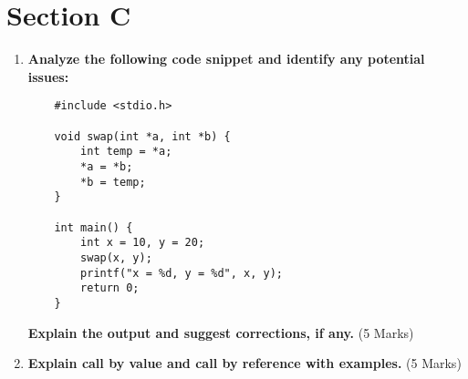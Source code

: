 \documentclass[a4paper,12pt]{article}
\begin{document}
\vspace{10pt}

\section*{\centering Section C}

\begin{enumerate}[label=\textbf{Q\arabic*.}, start=8]

    \item \textbf{Analyze the following code snippet and identify any potential issues:}
    \begin{verbatim}
    #include <stdio.h>

    void swap(int *a, int *b) {
        int temp = *a;
        *a = *b;
        *b = temp;
    }

    int main() {
        int x = 10, y = 20;
        swap(x, y);
        printf("x = %d, y = %d", x, y);
        return 0;
    }
    \end{verbatim}
    \textbf{Explain the output and suggest corrections, if any.} \hfill (5 Marks)
    
    \item \textbf{Explain call by value and call by reference with examples.} \hfill (5 Marks)
\end{enumerate}
\end{document}

